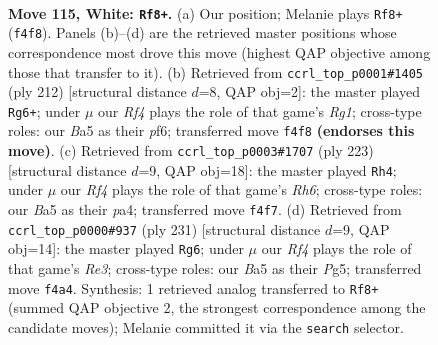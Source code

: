 \documentclass[11pt]{article}
\begin{document}
\clearpage

\begin{figure}[p]\centering
\begin{subfigure}{0.46\textwidth}\centering
\resizebox{\linewidth}{!}{%
\newchessgame
\chessboard[
  setfen={7k/8/7r/B7/5R2/8/K4p2/8 w - - 0 115},
  showmover=false,
  pgfstyle=straightmove, color=movearrow, markmove={f4-f8}
]}
\caption{}
\end{subfigure}\hfill
\begin{subfigure}{0.46\textwidth}\centering
\resizebox{\linewidth}{!}{%
\newchessgame
\chessboard[
  setfen={8/8/5p1k/5P2/7r/5K2/8/6R1 w - - 26 107},
  showmover=false,
  pgfstyle=straightmove, color=movearrow, markmove={g1-g6}
]}
\caption{}
\end{subfigure}
\\[4pt]
\begin{subfigure}{0.46\textwidth}\centering
\resizebox{\linewidth}{!}{%
\newchessgame
\chessboard[
  setfen={7R/8/2k5/7P/P7/7r/1K6/8 b - - 0 112},
  showmover=false,
  pgfstyle=straightmove, color=movearrow, markmove={h3-h4}
]}
\caption{}
\end{subfigure}\hfill
\begin{subfigure}{0.46\textwidth}\centering
\resizebox{\linewidth}{!}{%
\newchessgame
\chessboard[
  setfen={3R4/6k1/4r3/6p1/6P1/3KP3/8/8 b - - 98 116},
  showmover=false,
  pgfstyle=straightmove, color=movearrow, markmove={e6-g6}
]}
\caption{}
\end{subfigure}
\caption{\textbf{Move 115, White: \texttt{Rf8+}.} (a) Our position; Melanie plays \texttt{Rf8+} (\texttt{f4f8}). Panels (b)--(d) are the retrieved master positions whose correspondence most drove this move (highest QAP objective among those that transfer to it). (b) Retrieved from \texttt{ccrl\_top\_p0001\#1405} (ply 212) [structural distance $d$=8, QAP obj=2]: the master played \texttt{Rg6+}; under $\mu$ our \emph{Rf4} plays the role of that game's \emph{Rg1}; cross-type roles: our \emph{B}a5 as their \emph{p}f6; transferred move \texttt{f4f8} \textbf{(endorses this move)}. (c) Retrieved from \texttt{ccrl\_top\_p0003\#1707} (ply 223) [structural distance $d$=9, QAP obj=18]: the master played \texttt{Rh4}; under $\mu$ our \emph{Rf4} plays the role of that game's \emph{Rh6}; cross-type roles: our \emph{B}a5 as their \emph{p}a4; transferred move \texttt{f4f7}. (d) Retrieved from \texttt{ccrl\_top\_p0000\#937} (ply 231) [structural distance $d$=9, QAP obj=14]: the master played \texttt{Rg6}; under $\mu$ our \emph{Rf4} plays the role of that game's \emph{Re3}; cross-type roles: our \emph{B}a5 as their \emph{P}g5; transferred move \texttt{f4a4}. Synthesis: 1 retrieved analog transferred to \texttt{Rf8+} (summed QAP objective 2, the strongest correspondence among the candidate moves); Melanie committed it via the \texttt{search} selector.}
\label{fig:thought-m228}
\end{figure}
\end{document}

